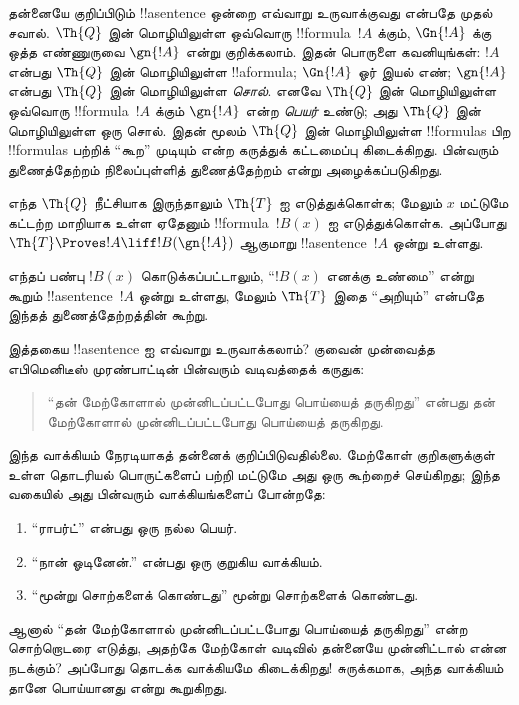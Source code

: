 \documentclass[../../../include/open-logic-section]{subfiles}
\begin{document}
தன்னையே குறிப்பிடும் !!a{sentence} ஒன்றை எவ்வாறு உருவாக்குவது என்பதே
முதல் சவால். $\Th{Q}$ இன் மொழியிலுள்ள ஒவ்வொரு !!{formula}~$!A$ க்கும்,
$\Gn{!A}$ க்கு ஒத்த எண்ணுருவை $\gn{!A}$ என்று குறிக்கலாம். இதன் பொருளை
கவனியுங்கள்: $!A$ என்பது $\Th{Q}$ இன் மொழியிலுள்ள !!a{formula};
$\Gn{!A}$ ஓர் இயல் எண்; $\gn{!A}$ என்பது $\Th{Q}$ இன் மொழியிலுள்ள
\emph{சொல்}. எனவே $\Th{Q}$ இன் மொழியிலுள்ள ஒவ்வொரு !!{formula}~$!A$
க்கும் $\gn{!A}$ என்ற \emph{பெயர்} உண்டு; அது $\Th{Q}$ இன் மொழியிலுள்ள ஒரு
சொல். இதன் மூலம் $\Th{Q}$ இன் மொழியிலுள்ள !!{formula}s பிற
!!{formula}s பற்றிக் “கூற” முடியும் என்ற கருத்துக் கட்டமைப்பு
கிடைக்கிறது. பின்வரும் துணைத்தேற்றம் நிலைப்புள்ளித் துணைத்தேற்றம்
என்று அழைக்கப்படுகிறது.

\begin{lem}
எந்த $\Th{Q}$ நீட்சியாக இருந்தாலும் $\Th{T}$ ஐ எடுத்துக்கொள்க; மேலும்
$x$ மட்டுமே கட்டற்ற மாறியாக உள்ள ஏதேனும் !!{formula}~$!B(x)$ ஐ
எடுத்துக்கொள்க. அப்போது
$\Th{T} \Proves!A \liff !B(\gn{!A})$ ஆகுமாறு !!a{sentence}~$!A$
ஒன்று உள்ளது.
\end{lem}

எந்தப் பண்பு $!B(x)$ கொடுக்கப்பட்டாலும், “$!B(x)$ எனக்கு உண்மை”
என்று கூறும் !!a{sentence}~$!A$ ஒன்று உள்ளது, மேலும் $\Th{T}$ இதை
“அறியும்” என்பதே இந்தத் துணைத்தேற்றத்தின் கூற்று.

இத்தகைய !!a{sentence} ஐ எவ்வாறு உருவாக்கலாம்? குவைன் முன்வைத்த
எபிமெனிடீஸ் முரண்பாட்டின் பின்வரும் வடிவத்தைக் கருதுக:
\begin{quote}
“தன் மேற்கோளால் முன்னிடப்பட்டபோது பொய்யைத் தருகிறது” என்பது தன்
மேற்கோளால் முன்னிடப்பட்டபோது பொய்யைத் தருகிறது.
\end{quote}
இந்த வாக்கியம் நேரடியாகத் தன்னைக் குறிப்பிடுவதில்லை. மேற்கோள் குறிகளுக்குள்
உள்ள தொடரியல் பொருட்களைப் பற்றி மட்டுமே அது ஒரு கூற்றைச் செய்கிறது;
இந்த வகையில் அது பின்வரும் வாக்கியங்களைப் போன்றதே:
\begin{enumerate}
\item “ராபர்ட்” என்பது ஒரு நல்ல பெயர்.
\item “நான் ஓடினேன்.” என்பது ஒரு குறுகிய வாக்கியம்.
\item “மூன்று சொற்களைக் கொண்டது” மூன்று சொற்களைக் கொண்டது.
\end{enumerate}
ஆனால் “தன் மேற்கோளால் முன்னிடப்பட்டபோது பொய்யைத் தருகிறது” என்ற
சொற்றொடரை எடுத்து, அதற்கே மேற்கோள் வடிவில் தன்னையே முன்னிட்டால் என்ன
நடக்கும்? அப்போது தொடக்க வாக்கியமே கிடைக்கிறது!{} சுருக்கமாக, அந்த
வாக்கியம் தானே பொய்யானது என்று கூறுகிறது.
\end{document}
